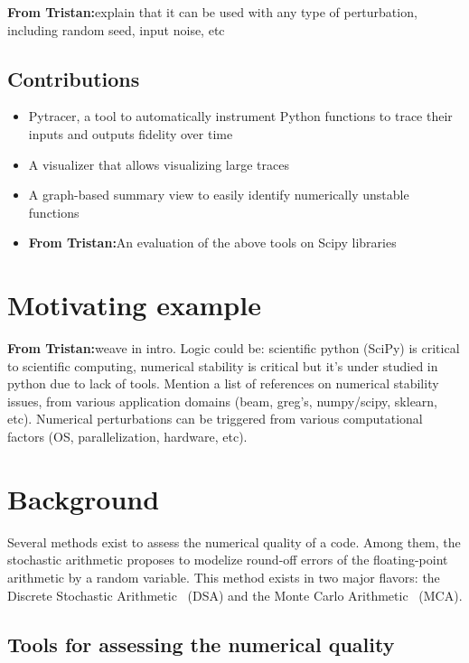 \documentclass[acmconf,authordraft,anonymous,review]{acmart}
\newcommand{\tristan}[1]{\color{orange}\textbf{From Tristan:}#1\color{black}}
\newcommand{\Yohan}[1]{\todo[inline,backgroundcolor=green]{YC:#1}}
\begin{document}
\tristan{explain that it can be used with any type of perturbation, including random seed, input noise, etc}

\subsection{Contributions}
\begin{itemize}
    \item Pytracer, a tool to automatically instrument Python functions 
    to trace their inputs and outputs fidelity over time
    \item A visualizer that allows visualizing large traces 
    \item A graph-based summary view to easily identify numerically unstable functions 
    \item \tristan{An evaluation of the above tools on Scipy libraries}
\end{itemize}

\section{Motivating example}    

\Yohan{Find motivating example}

\tristan{weave in intro. Logic could be: scientific python (SciPy) is critical to scientific computing, numerical stability is critical but it's under studied in python due to lack of tools. Mention a list of references on numerical stability issues, from various application domains (beam, greg's, numpy/scipy, sklearn, etc). Numerical perturbations can be triggered from various computational factors (OS, parallelization, hardware, etc).}

\section{Background}

Several methods exist to assess the numerical quality of a code.
Among them, the stochastic arithmetic proposes to modelize round-off errors 
of the floating-point arithmetic by a random variable. This method exists 
in two major flavors: the Discrete Stochastic Arithmetic~\cite{vignes2004discrete} (DSA)
and the Monte Carlo Arithmetic~\cite{parker1997monte} (MCA).

\subsection{Tools for assessing the numerical quality}
\end{document}
